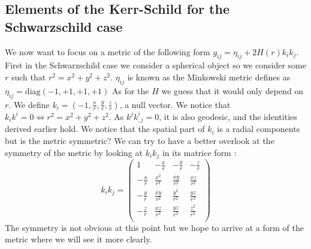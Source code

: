\documentclass[a4paper,12pt]{article}
\theoremstyle{definition}
\begin{document}
\subsection{Elements of the Kerr-Schild for the Schwarzschild case}
We now want to focus on a metric of the following form $g_{ij}=\eta_{ij}+2H(r)k_ik_j$.
First in the Schwarzschild case we consider a spherical object so we consider some $r$ such that $r^2=x^2+y^2+z^2$.
$\eta_{ij}$ is known as the Minkowski metric defines as $\eta_{ij}=\text{diag}(-1,+1,+1,+1)$
As for the $H$ we guess that it would only depend on $r$.
We define $k_i=(-1,\frac{x}{r},\frac{y}{r},\frac{z}{r})$, a null vector.
We notice that $k_ik^i=0 \Leftrightarrow r^2=x^2+y^2+z^2$.
As $k^jk^i_{,j}=0$, it is also geodesic, and the identities derived earlier hold.
We notice that the spatial part of $k_i$ is a radial components but is the metric symmetric?
We can try to have a better overlook at the symmetry of the metric by looking at $k_ik_j$ in its matrice form :
\begin{equation}
	k_ik_j=\left(
	\begin{array}{cccc}
	1 & -\frac{x}{r} & -\frac{y}{r} & -\frac{z}{r} \\
	-\frac{x}{r} & \frac{x^2}{r^2} & \frac{x y}{r^2} &
	\frac{x z}{r^2} \\
	-\frac{y}{r} & \frac{x y}{r^2} & \frac{y^2}{r^2} &
	\frac{y z}{r^2} \\
	-\frac{z}{r} & \frac{x z}{r^2} & \frac{y z}{r^2} &
	\frac{z^2}{r^2} \\
	\end{array}
	\right)
\end{equation}
The symmetry is not obvious at this point but we hope to arrive at a form of the metric where we will see it more clearly.
\end{document}
